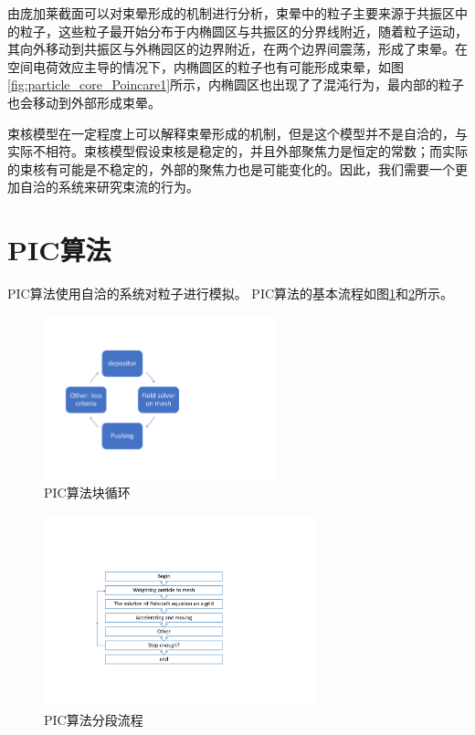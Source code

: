 由庞加莱截面可以对束晕形成的机制进行分析，束晕中的粒子主要来源于共振区中的粒子，这些粒子最开始分布于内椭圆区与共振区的分界线附近，随着粒子运动，其向外移动到共振区与外椭园区的边界附近，在两个边界间震荡，形成了束晕。在空间电荷效应主导的情况下，内椭圆区的粒子也有可能形成束晕，如图\ref{fig:particle_core_Poincare1}所示，内椭圆区也出现了了混沌行为，最内部的粒子也会移动到外部形成束晕。

束核模型在一定程度上可以解释束晕形成的机制，但是这个模型并不是自洽的，与实际不相符。束核模型假设束核是稳定的，并且外部聚焦力是恒定的常数；而实际的束核有可能是不稳定的，外部的聚焦力也是可能变化的。因此，我们需要一个更加自洽的系统来研究束流的行为。

\section{PIC算法}
\label{section:PIC_algorithm}
PIC算法使用自洽的系统对粒子进行模拟。
PIC算法的基本流程如图\ref{fig:PICflow1}和\ref{fig:PICflow2}所示。

\begin{figure}[!tbh]
  \centering
    \includegraphics[width=0.6\textwidth]{Img/3_1_PIC.pdf}
    \caption{PIC算法块循环}
    \label{fig:PICflow1}
\end{figure}

\begin{figure}[!tbh]
  \centering
    \includegraphics[width=0.7\textwidth]{Img/3_1_PIC2.pdf}
    \caption{PIC算法分段流程}
    \label{fig:PICflow2}
\end{figure}

